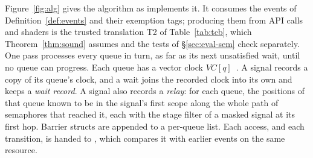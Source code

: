Figure~\ref{fig:alg} gives the algorithm as \sys implements it. It consumes the events of
Definition~\ref{def:events} and their exemption tags; producing them from API calls and shaders is the trusted
translation T2 of Table~\ref{tab:tcb}, which Theorem~\ref{thm:sound} assumes and the tests of
\S\ref{sec:eval-sem} check separately. One pass processes every queue in
turn, as far as its next unsatisfied wait, until no queue can progress. Each queue has a vector clock
$\mathit{VC}[q]$~\cite{mattern1989virtual}. A signal records a copy of its queue's clock, and a wait joins the
recorded clock into its own and keeps a \emph{wait record}. A signal also records a \emph{relay}: for each queue,
the positions of that queue known to be in the signal's first scope along the whole path of semaphores that reached
it, each with the stage filter of a masked signal at its first hop. Barrier structs are appended to a per-queue list. Each
access, and each transition, is handed to , which compares it with earlier events on the same resource.

